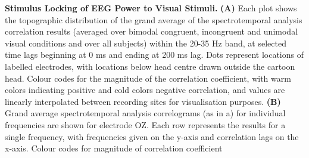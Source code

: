 \textbf{Stimulus Locking of EEG Power to Visual Stimuli.} \textbf{(A)} Each plot shows the
topographic distribution of the grand average of the spectrotemporal
analysis correlation results (averaged over bimodal congruent, incongruent
and unimodal visual conditions and over all subjects) within the 20-35 Hz
band, at selected time lags beginning at 0 ms and ending at 200 ms lag.
Dots represent locations of labelled electrodes, with locations below head
centre drawn outside the cartoon head. Colour codes for the magnitude of
the correlation coefficient, with warm colors indicating positive and cold
colors negative correlation, and values are linearly interpolated between
recording sites for visualisation purposes. \textbf{(B)} Grand average
spectrotemporal analysis correlograms (as in a) for individual frequencies
are shown for electrode OZ. Each row represents the results for a single
frequency, with frequencies given on the y-axis and correlation lags on the
x-axis. Colour codes for magnitude of correlation coefficient
